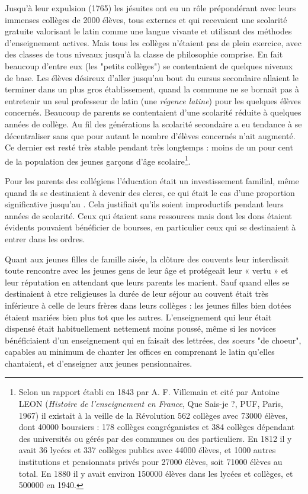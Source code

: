 Jusqu'à leur expulsion (1765) les jésuites ont eu un rôle prépondérant avec leurs immenses collèges de 2000 élèves, tous externes et qui recevaient une scolarité gratuite valorisant le latin comme une langue vivante et utilisant des méthodes d'enseignement actives. Mais tous les collèges n'étaient pas de plein exercice, avec des classes de tous niveaux jusqu'à la classe de philosophie comprise. En fait beaucoup d'entre eux (les "petits collèges") se contentaient de quelques niveaux de base. Les élèves désireux d'aller jusqu'au bout du cursus secondaire allaient le terminer dans un plus gros établissement, quand la commune ne se bornait pas à entretenir un seul professeur de latin (une \emph{régence latine}) pour les quelques élèves concernés. Beaucoup de parents se contentaient d'une scolarité réduite à quelques années de collège. Au fil des générations la scolarité secondaire a eu tendance à se décentraliser sans que pour autant le nombre d'élèves concernés n'ait augmenté. Ce dernier est resté très stable pendant très longtemps : moins de un pour cent de la population des jeunes garçons d'âge scolaire\footnote{Selon un rapport établi en 1843 par A. F. Villemain  et cité par Antoine LEON (\emph{Histoire de l'enseignement en France}, Que Sais-je ?, PUF, Paris, 1967) il existait à la veille de la Révolution 562 collèges avec 73000 élèves, dont 40000 boursiers : 178 collèges congréganistes et 384 collèges dépendant des universités ou gérés par des communes ou des particuliers. En 1812 il y avait 36 lycées et 337 collèges publics avec 44000 élèves, et 1000 autres institutions et pensionnats privés pour 27000 élèves, soit 71000 élèves au total. En 1880 il y avait environ 150000 élèves dans les lycées et collèges, et 500000 en 1940.}. 
 
 Pour les parents des collégiens l'éducation était un investissement familial, même quand ils se destinaient à devenir des clercs, ce qui était le cas d'une proportion significative jusqu'au . Cela justifiait qu'ils soient improductifs pendant leurs années de scolarité. Ceux qui étaient sans ressources mais dont les dons étaient évidents pouvaient bénéficier de bourses, en particulier ceux qui se destinaient à entrer dans les ordres.




Quant aux jeunes filles de famille aisée, la clôture des couvents leur interdisait toute rencontre avec les jeunes gens de leur âge et protégeait leur « vertu » et leur réputation en attendant que leurs parents les marient. Sauf quand elles se destinaient à etre religieuses la durée de leur séjour au couvent était très inférieure à celle de leurs frères dans leurs collèges : les jeunes filles bien dotées étaient mariées bien plus tot que les autres. L'enseignement qui leur était dispensé était habituellement nettement moins poussé, même si les novices bénéficiaient d'un enseignement qui en faisait des lettrées, des soeurs "de choeur", capables au minimum de chanter les offices en comprenant le latin qu'elles chantaient, et d'enseigner aux jeunes pensionnaires.

